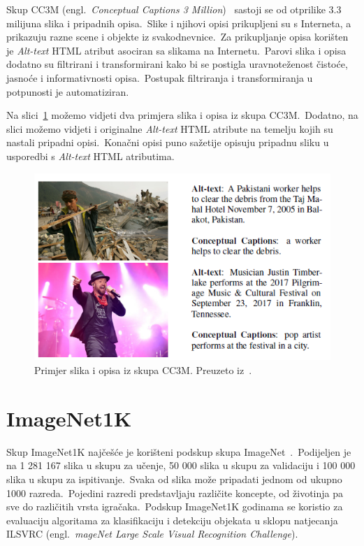 \documentclass[times, utf8, seminar, numeric]{fer}
\begin{document}
Skup CC3M (engl.\ \textit{Conceptual Captions 3 Million})~\cite{sharma2018conceptual} sastoji se od otprilike 3.3 milijuna slika i pripadnih opisa.\ 
Slike i njihovi opisi prikupljeni su s Interneta, a prikazuju razne scene i objekte iz svakodnevnice.\ Za prikupljanje opisa korišten je \textit{Alt-text} HTML atribut asociran sa slikama na Internetu.\ 
Parovi slika i opisa dodatno su filtrirani i transformirani kako bi se postigla uravnoteženost čistoće, jasnoće i informativnosti opisa.\ Postupak filtriranja i transformiranja u potpunosti je automatiziran.\ 

Na slici~\ref{fig:CC3M} možemo vidjeti dva primjera slika i opisa iz skupa CC3M.\ Dodatno, na slici možemo vidjeti i originalne \textit{Alt-text} HTML atribute na temelju kojih su nastali pripadni opisi.\
Konačni opisi puno sažetije opisuju pripadnu sliku u usporedbi s \textit{Alt-text} HTML atributima.\

\begin{figure}[h]
    \centering
    \includegraphics[scale=0.7]{./Slike/CC3M.png}
    \caption{Primjer slika i opisa iz skupa CC3M. Preuzeto iz~\cite{sharma2018conceptual}.}
    \label{fig:CC3M}
\end{figure}

\section{ImageNet1K}

Skup ImageNet1K najčešće je korišteni podskup skupa ImageNet~\cite{deng2009imagenet}.\ 
Podijeljen je na 1 281 167 slika u skupu za učenje, 50 000 slika u skupu za validaciju i 100 000 slika u skupu za ispitivanje.\ 
Svaka od slika može pripadati jednom od ukupno 1000 razreda.\ Pojedini razredi predstavljaju različite koncepte, od životinja pa sve do različitih vrsta igračaka.\ 
Podskup ImageNet1K godinama se koristio za evaluaciju algoritama za klasifikaciju i detekciju objekata u sklopu natjecanja ILSVRC (engl.\ \textit{mageNet Large Scale Visual Recognition Challenge}).\
  
\end{document}
